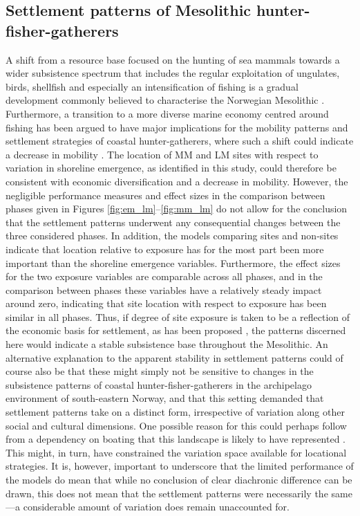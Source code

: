 \documentclass[12pt, a4paper]{article}
\begin{document}
\subsection{Settlement patterns of Mesolithic hunter-fisher-gatherers}
A shift from a resource base focused on the hunting of sea mammals towards a wider subsistence spectrum that includes the regular exploitation of ungulates, birds, shellfish and especially an intensification of fishing is a gradual development commonly believed to characterise the Norwegian Mesolithic \citep[][]{breivik2014, bjerck2016, ritchie2016, jorgensen2020, mjaerum2020}. Furthermore, a transition to a more diverse marine economy centred around fishing has been argued to have major implications for the mobility patterns and settlement strategies of coastal hunter-gatherers, where such a shift could indicate a decrease in mobility \citep[see above and][]{boethius2017, boethius2018}. The location of MM and LM sites with respect to variation in shoreline emergence, as identified in this study, could therefore be consistent with economic diversification and a decrease in mobility. However, the negligible performance measures and effect sizes in the comparison between phases given in Figures \ref{fig:em_lm}--\ref{fig:mm_lm} do not allow for the conclusion that the settlement patterns underwent any consequential changes between the three considered phases. In addition, the models comparing sites and non-sites indicate that location relative to exposure has for the most part been more important than the shoreline emergence variables. Furthermore, the effect sizes for the two exposure variables are comparable across all phases, and in the comparison between phases these variables have a relatively steady impact around zero, indicating that site location with respect to exposure has been similar in all phases. Thus, if degree of site exposure is taken to be a reflection of the economic basis for settlement, as has been proposed \citep[e.g.][]{bjerck2009, breivik2014}, the patterns discerned here would indicate a stable subsistence base throughout the Mesolithic. An alternative explanation to the apparent stability in settlement patterns could of course also be that these might simply not be sensitive to changes in the subsistence patterns of coastal hunter-fisher-gatherers in the archipelago environment of south-eastern Norway, and that this setting demanded that settlement patterns take on a distinct form, irrespective of variation along other social and cultural dimensions. One possible reason for this could perhaps follow from a dependency on boating that this landscape is likely to have represented \citep[e.g.][]{bjerck2008, glorstad2013}. This might, in turn, have constrained the variation space available for locational strategies. It is, however, important to underscore that the limited performance of the models do mean that while no conclusion of clear diachronic difference can be drawn, this does not mean that the settlement patterns were necessarily the same---a considerable amount of variation does remain unaccounted for.
\end{document}
